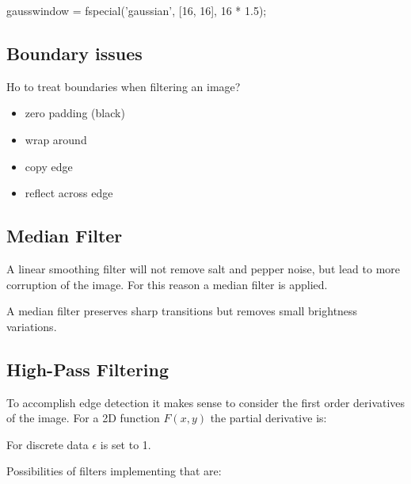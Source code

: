 \documentclass[10pt,a4paper]{scrartcl}
\begin{document}
\begin{multicols*}{2}
\begin{TPMatlab}
gausswindow = fspecial('gaussian', [16, 16], 16 * 1.5);
\end{TPMatlab}

\subsection{Boundary issues}

Ho to treat boundaries when filtering an image?

\begin{itemize}
\item zero padding (black)
\item wrap around
\item copy edge
\item reflect across edge
\end{itemize}

\subsection{Median Filter}

A linear smoothing filter will not remove salt and pepper noise, but lead to more corruption of the image. For this reason a median filter is applied.


A median filter preserves sharp transitions but removes small brightness variations.

\subsection{High-Pass Filtering}

To accomplish edge detection it makes sense to consider the first order derivatives of the image. For a 2D function $F(x,y)$ the partial derivative is:


For discrete data $\epsilon$ is set to 1.


Possibilities of filters implementing that are:



\end{multicols*}
\end{document}
